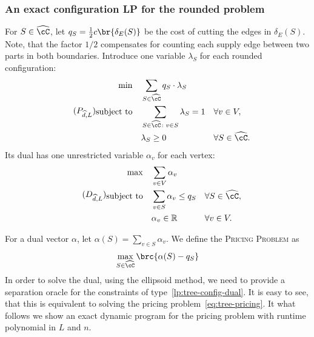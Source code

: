 
\iffalse
\subsubsection{An exact configuration LP for the rounded problem}

For $S\in\widehat\cC$, let $
    q_S=\frac{1}{2}c\br{\delta_E(S)}$ be the cost of cutting the edges in $\delta_E(S)$.
Note, that the factor $1/2$ compensates for counting each supply edge between two parts in both boundaries. Introduce one variable $\lambda_S$ for each rounded configuration:
\begingroup
\renewcommand{\theHequation}{tree-config-primal}
\begin{equation}\label{lp:tree-config-primal}
\tag{$P_{\widehat d,L}$}
\begin{aligned}
    \min\quad
        & \sum_{S\in\widehat\cC}q_S\cdot \lambda_S \\
    \text{subject to}\quad
        & \sum_{S\in\widehat\cC\colon v\in S}\lambda_S=1
            && \forall v\in V,\\
        & \lambda_S\geq0
            && \forall S\in\widehat\cC.
\end{aligned}
\end{equation}
\endgroup
Its dual has one unrestricted variable $\alpha_v$ for each vertex:
\begingroup
\renewcommand{\theHequation}{tree-config-dual}
\begin{equation}\label{lp:tree-config-dual}
\tag{$D_{\widehat d,L}$}
\begin{aligned}
    \max\quad
        & \sum_{v\in V}\alpha_v \\
    \text{subject to}\quad
        & \sum_{v\in S}\alpha_v\leq q_S
            && \forall S\in\widehat\cC,\\
        & \alpha_v\in\mathbb{R}
            && \forall v\in V.
\end{aligned}
\end{equation}
\endgroup

For a dual vector $\alpha$, let $
    \alpha(S)=\sum_{v\in S}\alpha_v.$
We define the \textsc{Pricing Problem} as
\begin{equation}\label{eq:tree-pricing}
    \max_{S\in\widehat\cC}\brc{\alpha(S)-q_S}
\end{equation}
In order to solve the dual, using the ellipsoid method, we need to provide a separation oracle for the constraints of type~\eqref{lp:tree-config-dual}. It is easy to see, that this is equivalent to solving the pricing problem~\eqref{eq:tree-pricing}. It what follows we show an exact dynamic program for the pricing problem with runtime polynomial in $L$ and $n$.

